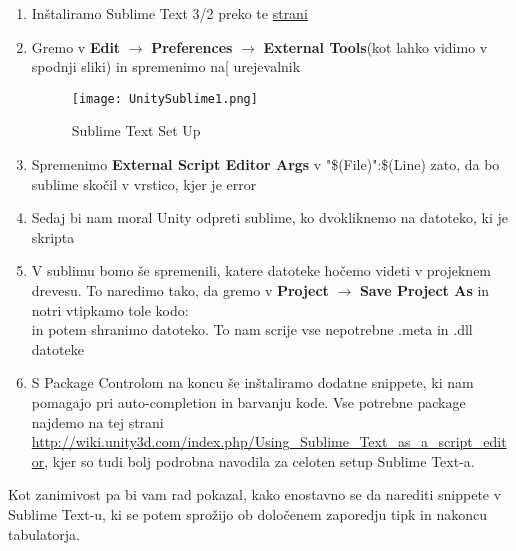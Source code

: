 \begin{enumerate}
	\item Inštaliramo Sublime Text 3/2 preko te \href{http://www.sublimetext.com/3}{strani}
	\item Gremo v \textbf{Edit} $\rightarrow$ \textbf{Preferences} $\rightarrow$ \textbf{External Tools}(kot lahko vidimo v spodnji sliki) in spremenimo na[ urejevalnik\\
	\begin{figure}[ht!]
  		\centering
		\texttt{[image: UnitySublime1.png]}
		\caption{Sublime Text Set Up}
	\end{figure}
	\item Spremenimo \textbf{External Script Editor Args} v "\$(File)":\$(Line) zato, da bo sublime skočil v vrstico, kjer je error 
	\item Sedaj bi nam moral Unity odpreti sublime, ko dvokliknemo na datoteko, ki je skripta
	\item V sublimu bomo še spremenili, katere datoteke hočemo videti v projeknem drevesu. To naredimo tako, da gremo v \textbf{Project} $\rightarrow$ \textbf{Save Project As} in notri vtipkamo tole kodo:\\
	in potem shranimo datoteko. To nam scrije vse nepotrebne .meta in .dll datoteke
	\item S Package Controlom na koncu še inštaliramo dodatne snippete, ki nam pomagajo pri auto-completion in barvanju kode. Vse potrebne package najdemo na tej strani \url{http://wiki.unity3d.com/index.php/Using_Sublime_Text_as_a_script_editor}, kjer so tudi bolj podrobna navodila za celoten setup Sublime Text-a.
\end{enumerate}
Kot zanimivost pa bi vam rad pokazal, kako enostavno se da narediti snippete v Sublime Text-u, ki se potem sprožijo ob določenem zaporedju tipk in nakoncu tabulatorja. 
